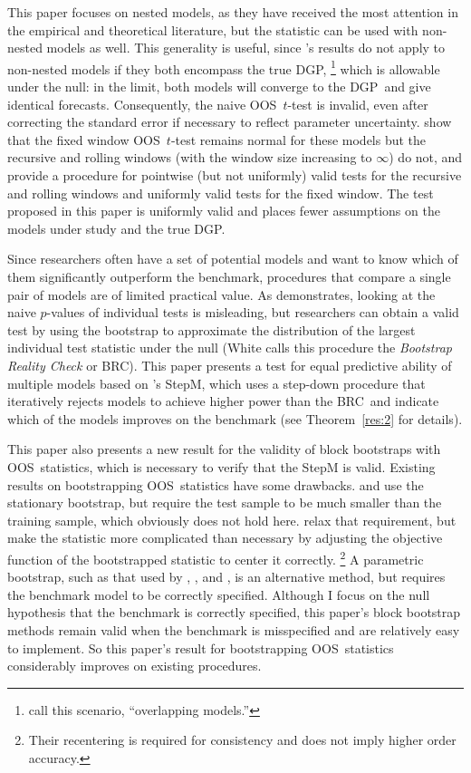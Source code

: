 \documentclass[12pt,fleqn]{article}
\newcommand\citepos[2][]{\citeauthor{#2}'s \citeyearpar[#1]{#2}}
\theoremstyle{definition}
\newcommand{\brc}{BRC}
\newcommand{\dgp}{DGP}
\newcommand{\oos}{OOS}
\begin{document}
This paper focuses on nested models, as they have received the most
attention in the empirical and theoretical literature, but the
statistic can be used with non-nested models as well.  This generality
is useful, since \citepos{Wes:96} results do not apply to non-nested
models if they both encompass the true \dgp,%
\footnote{\citet{ClM:11b}
  call this scenario, ``overlapping models.''} %
which is allowable
under the null: in the limit, both models will converge to the \dgp\
and give identical forecasts.  Consequently, the naive \oos\ $t$-test
is invalid, even after correcting the standard error if necessary to
reflect parameter uncertainty.  \citet{ClM:11b} show that the fixed
window \oos\ $t$-test remains normal for these models but the
recursive and rolling windows (with the window size increasing to
$\infty$) do not, and provide a procedure for pointwise (but not
uniformly) valid tests for the recursive and rolling windows and
uniformly valid tests for the fixed window.  The test proposed in this
paper is uniformly valid and places fewer assumptions on the models
under study and the true \dgp.

Since researchers often have a set of potential models and want to
know which of them significantly outperform the benchmark, procedures
that compare a single pair of models are of limited practical value.
As \citet{Whi:00} demonstrates, looking at the naive $p$-values of
individual tests is misleading, but researchers can obtain a valid test
by using the bootstrap to approximate the distribution of the largest
individual test statistic under the null (White calls this procedure
the \textit{Bootstrap Reality Check} or \brc).  This paper presents a test
for equal predictive ability of multiple models based on
\citepos{RoW:05} StepM, which uses a step-down procedure that
iteratively rejects models to achieve higher power than the \brc\ and
indicate which of the models improves on the benchmark (see
Theorem~\ref{res:2} for details).

This paper also presents a new result for the validity of block
bootstraps with \oos\ statistics, which is necessary to verify that
the StepM is valid.  Existing results on bootstrapping \oos\
statistics have some drawbacks.  \citet{Whi:00} and \citet{Han:05} use
the stationary bootstrap, but require the test sample to be much
smaller than the training sample, which obviously does not hold here.
\citet{CoS:07} relax that requirement, but make the statistic more
complicated than necessary by adjusting the objective function of the
bootstrapped statistic to center it correctly.%
\footnote{Their
  recentering is required for consistency and does not imply higher
  order accuracy.} %
A parametric bootstrap, such as that used by
\cite{Mar:95}, \cite{Lut:99}, and \citet{ClM:12b}, is an alternative
method, but requires the benchmark model to be correctly specified.
Although I focus on the null hypothesis that the benchmark is
correctly specified, this paper's block bootstrap methods remain valid
when the benchmark is misspecified and are relatively easy to
implement.  So this paper's result for bootstrapping \oos\ statistics
considerably improves on existing procedures.
\end{document}

